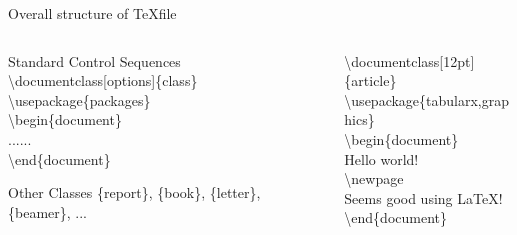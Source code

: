 \documentclass[10pt,xcolor={dvipsnames}]{beamer}
\begin{document}
	
		\begin{frame}{Overall structure of \TeX file}
			
			\begin{columns}[T]
				\begin{column}{.5 \textwidth}
					
					\begin{block}{Standard Control Sequences}
						\textbackslash documentclass[{\color{red}options}]\{{\color{orange}class}\}\\
						\textbackslash usepackage\{{\color{blue}packages}\}\\
						\textbackslash begin\{document\}\\
						\quad......\\
						\textbackslash end\{document\}\\
					\end{block}
					
					
					\begin{block}{Other Classes}
						\{report\}, \{book\}, \{letter\}, \{beamer\}, ...
					\end{block}
					
				\end{column}
				
				\begin{column}{.5 \textwidth}
					\begin{example}
						\textbackslash documentclass[{\color{red}12pt}]\{{\color{orange}article}\}\\
						\textbackslash usepackage\{{\color{blue}tabularx,graphics}\}\\
						\textbackslash begin\{document\}\\
						\quad Hello world!\\
						\textbackslash newpage\\
						\quad Seems good using \LaTeX!\\
						\textbackslash end\{document\}\\
					\end{example}
				\end{column}
				
			\end{columns}

		\end{frame}
	
\end{document}
